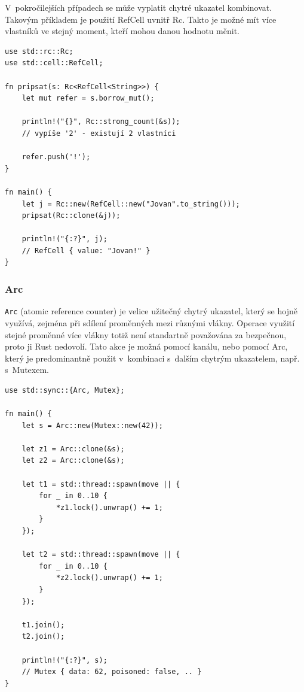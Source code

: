 \documentclass[a4paper, 12pt]{article} %
\newcommand{\rust}[1]{\texttt{#1}}
\begin{document}
                V~pokročilejších případech se může vyplatit chytré ukazatel kombinovat. Takovým příkladem je použití RefCell uvnitř Rc. Takto je možné mít více vlastníků ve stejný moment, kteří mohou danou hodnotu měnit.
                \begin{verbatim}
use std::rc::Rc;
use std::cell::RefCell;

fn pripsat(s: Rc<RefCell<String>>) {
    let mut refer = s.borrow_mut();

    println!("{}", Rc::strong_count(&s));
    // vypíše '2' - existují 2 vlastníci

    refer.push('!');
}

fn main() {
    let j = Rc::new(RefCell::new("Jovan".to_string()));
    pripsat(Rc::clone(&j));

    println!("{:?}", j);
    // RefCell { value: "Jovan!" }
}
                \end{verbatim}


            \subsubsection*{Arc}
                \rust{Arc} (atomic reference counter) je velice užitečný chytrý ukazatel, který se hojně využívá, zejména při sdílení proměnných mezi různými vlákny. Operace využití stejné proměnné více vlákny totiž není standartně považována za bezpečnou, proto ji Rust nedovolí. Tato akce je možná pomocí kanálu, nebo pomocí Arc, který je predominantně použit v~kombinaci s~dalším chytrým ukazatelem, např. s~Mutexem.
                \begin{verbatim}
use std::sync::{Arc, Mutex};

fn main() {
    let s = Arc::new(Mutex::new(42));
    
    let z1 = Arc::clone(&s);
    let z2 = Arc::clone(&s);
    
    let t1 = std::thread::spawn(move || {
        for _ in 0..10 {
            *z1.lock().unwrap() += 1;
        }
    });

    let t2 = std::thread::spawn(move || {
        for _ in 0..10 {
            *z2.lock().unwrap() += 1;
        }
    });

    t1.join();
    t2.join();

    println!("{:?}", s);
    // Mutex { data: 62, poisoned: false, .. }
}
                \end{verbatim}
                \cite{mutex}
        
        
\end{document}
